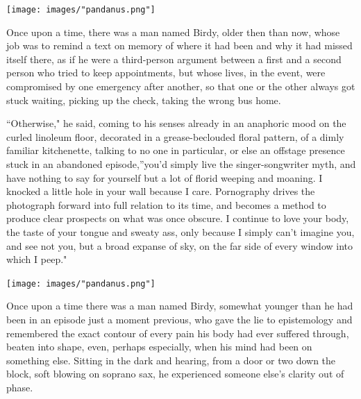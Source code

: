\documentclass[
]{memoir}
\begin{document}
\begin{center}\texttt{[image: images/"pandanus.png"]}\end{center}

Once upon a time, there was a man named Birdy, older then than now,
whose job was to remind a text on memory of where it had been and why it
had missed itself there, as if he were a third-person argument between a
first and a second person who tried to keep appointments, but whose
lives, in the event, were compromised by one emergency after another, so
that one or the other always got stuck waiting, picking up the check,
taking the wrong bus home.

``Otherwise," he said, coming to his senses already in an anaphoric mood
on the curled linoleum floor, decorated in a grease-beclouded floral
pattern, of a dimly familiar kitchenette, talking to no one in
particular, or else an offstage presence stuck in an abandoned
episode,''you'd simply live the singer-songwriter myth, and have nothing
to say for yourself but a lot of florid weeping and moaning. I knocked a
little hole in your wall because I care. Pornography drives the
photograph forward into full relation to its time, and becomes a method
to produce clear prospects on what was once obscure. I continue to love
your body, the taste of your tongue and sweaty ass, only because I
simply can't imagine you, and see not you, but a broad expanse of sky,
on the far side of every window into which I peep."

\begin{center}\texttt{[image: images/"pandanus.png"]}\end{center}

Once upon a time there was a man named Birdy, somewhat younger than he
had been in an episode just a moment previous, who gave the lie to
epistemology and remembered the exact contour of every pain his body had
ever suffered through, beaten into shape, even, perhaps especially, when
his mind had been on something else. Sitting in the dark and hearing,
from a door or two down the block, soft blowing on soprano sax, he
experienced someone else's clarity out of phase.
\end{document}
